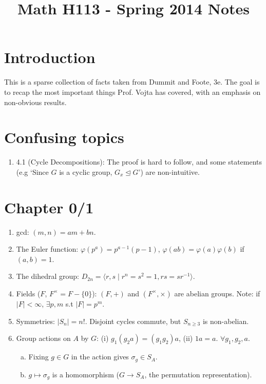 \documentclass{article}
\title{Math H113 - Spring 2014 Notes}
\begin{document}
\maketitle

\section*{Introduction}

This is a sparse collection of facts taken from Dummit and Foote, 3e. The
goal is to recap the most important things Prof. Vojta has covered, with an
emphasis on non-obvious results.

\section*{Confusing topics}

\begin{enumerate}[1.]
    \item 4.1 (Cycle Decompositions): The proof is hard to follow, and some
        statements (e.g `Since $G$ is a cyclic group, $G_x \trianglelefteq
        G$') are non-intuitive.
\end{enumerate}

\section*{Chapter 0/1}

\begin{enumerate}[1.]
    \item gcd: $(m, n) = am + bn$.
    \item The Euler function: $\varphi(p^a) = p^{a-1}(p - 1)$, $\varphi(ab)
        = \varphi(a)\varphi(b)$ if $(a, b) = 1$.
    \item The dihedral group: $D_{2n} = \langle r, s \mid r^n = s^2 = 1, rs
        = sr^{-1} \rangle$.
    \item Fields ($F$, $F^{\times} = F - \{0\}$): $(F, +)$ and $(F^{\times},
        \times)$ are abelian groups. Note: if $|F| < \infty$, $\exists p,m$
        s.t $|F| = p^m$.
    \item Symmetries: $|S_n| = n!$. Disjoint cycles commute, but $S_{n
        \geq 3}$ is non-abelian.
    \item Group actions on $A$ by $G$: (i) $g_1(g_2a) = (g_1g_2)a$, (ii) $1a
        = a$. $\forall g_1,g_2,a$.
        \begin{enumerate}[(a)]
            \item Fixing $g \in G$ in the action gives $\sigma_g \in S_A$.
            \item $g \mapsto \sigma_g$ is a homomorphism ($G \rightarrow
                S_A$, the permutation representation).
        \end{enumerate}
\end{enumerate}
\end{document}
